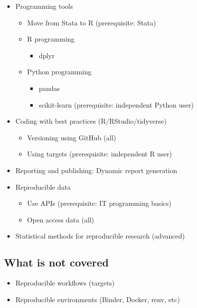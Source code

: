 \documentclass[
  letterpaper,
  DIV=11,
  numbers=noendperiod,
  oneside]{scrreprt}
\providecommand{\tightlist}{%
  \setlength{\itemsep}{0pt}\setlength{\parskip}{0pt}}\usepackage{longtable,booktabs,array}
\begin{document}
\begin{itemize}
\tightlist
\item
  Programming tools

  \begin{itemize}
  \tightlist
  \item
    Move from Stata to R (prerequisite: Stata)
  \item
    R programming

    \begin{itemize}
    \tightlist
    \item
      dplyr
    \end{itemize}
  \item
    Python programming

    \begin{itemize}
    \tightlist
    \item
      pandas
    \item
      scikit-learn (prerequisite: independent Python user)
    \end{itemize}
  \end{itemize}
\item
  Coding with best practices (R/RStudio/tidyverse)

  \begin{itemize}
  \tightlist
  \item
    Versioning using GitHub (all)
  \item
    Using targets (prerequisite: independent R user)
  \end{itemize}
\item
  Reporting and publishing: Dynamic report generation
\item
  Reproducible data

  \begin{itemize}
  \tightlist
  \item
    Use APIs (prerequisite: IT programming basics)
  \item
    Open access data (all)
  \end{itemize}
\item
  Statistical methods for reproducible research (advanced)
\end{itemize}

\hypertarget{what-is-not-covered}{%
\subsection{What is not covered}\label{what-is-not-covered}}

\begin{itemize}
\tightlist
\item
  Reproducible workflows (targets)
\item
  Reproducible environments (Binder, Docker, renv, etc)
\end{itemize}
\end{document}
